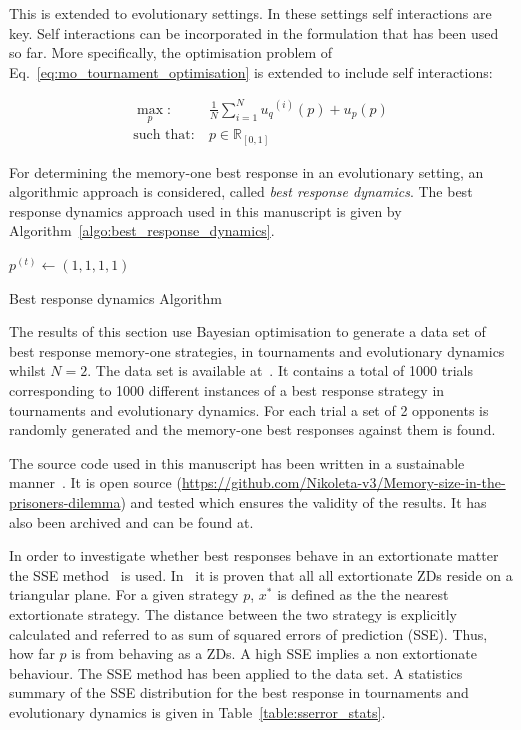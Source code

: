 \documentclass[9pt,twocolumn,twoside,lineno]{pnas-new}
\newcommand{\R}{\mathbb{R}}
\begin{document}
This is extended to evolutionary settings. In these settings
self interactions are key. Self interactions can be incorporated in the
formulation that has been used so far. More specifically, the optimisation
problem of Eq.~\ref{eq:mo_tournament_optimisation} is extended to include self
interactions:

\begin{equation}\label{eq:mo_evolutionary_optimisation}
\begin{aligned}
\max_p: & \ \frac{1}{N} \sum\limits_{i=1} ^ {N} {u_q}^{(i)} (p) + u_p(p)
\\
\text{such that}: & \ p \in \R_{[0, 1]}
\end{aligned}
\end{equation}

For determining the memory-one best response in an evolutionary setting, an
algorithmic approach is considered, called \textit{best response dynamics}. The
best response dynamics approach used in this manuscript is given by
Algorithm~\ref{algo:best_response_dynamics}.

\begin{algorithm}
       $p^{(t)}\leftarrow (1, 1, 1, 1)$\;
       \caption{Best response dynamics Algorithm}
       \label{algo:best_response_dynamics}
\end{algorithm}

The results of this section use Bayesian optimisation to generate a data set of best response
memory-one strategies, in tournaments and evolutionary dynamics whilst \(N=2\).
The data set is available at~\cite{glynatsi2019}. It contains a total of 1000 trials
corresponding to 1000 different instances of a best response strategy in
tournaments and evolutionary dynamics. For each trial a set of 2 opponents is
randomly generated and the memory-one best responses against them is found.

The source code used in this manuscript has been written in a sustainable manner~\cite{Benureau2018}.
It is open source (\url{https://github.com/Nikoleta-v3/Memory-size-in-the-prisoners-dilemma})
and tested which ensures the validity of the results. It has also been archived
and can be found at.

In order to investigate whether best responses
behave in an extortionate matter the SSE method~\cite{Knight2019} is used.
In~\cite{Knight2019} it is proven that all
all extortionate ZDs reside on a triangular plane. For a given strategy \(p\),
\(x^*\) is defined as the the nearest extortionate strategy. The distance between
the two strategy is explicitly calculated and referred to as sum of squared
errors of prediction (SSE). Thus, how far \(p\) is from behaving as a ZDs.
A high SSE implies a non extortionate behaviour. The SSE method has been applied to the data set.
A statistics summary
of the SSE distribution for the best response in tournaments and evolutionary dynamics is
given in Table~\ref{table:sserror_stats}.
\end{document}
